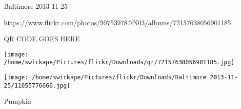 \documentclass[10pt,letterpaper]{article}
\begin{document}
Baltimore 2013-11-25

https://www.flickr.com/photos/99753978@N03/albums/72157638056901185

QR CODE GOES HERE

\texttt{[image: /home/swickape/Pictures/flickr/Downloads/qr/72157638056901185.jpg]}
\pagebreak

\texttt{[image: /home/swickape/Pictures/flickr/Downloads/Baltimore 2013-11-25/11055776666.jpg]}

Pumpkin\\
\pagebreak
\end{document}
